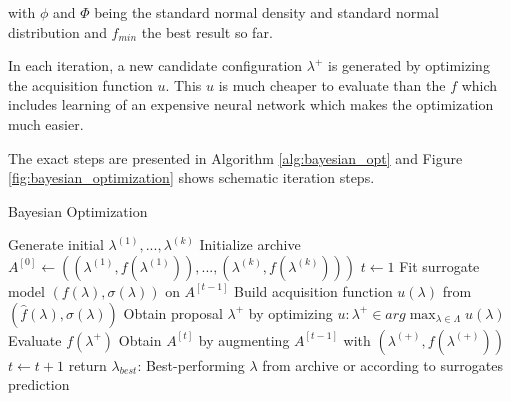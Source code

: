 with $ \phi $ and $ \Phi $ being the standard normal density and standard normal distribution and $ f_{min} $ the best result so far. 


In each iteration, a new candidate configuration $ \lambda^+ $  is generated by optimizing the acquisition function $ u $. This $ u $ is much cheaper to evaluate than the $ f $ which includes learning of an expensive neural network which makes the optimization much easier.

The exact steps are presented in Algorithm \ref{alg:bayesian_opt} and Figure \ref{fig:bayesian_optimization} shows schematic iteration steps.

\begin{algorithm}[htbp!]
	\caption{Bayesian Optimization}\label{alg:bayesian_opt}
	\begin{algorithmic}
		\State Generate initial $\lambda^{(1)}, ..., \lambda^{(k)} $
		\State Initialize archive $A^{[0]} \gets ((\lambda^{(1)}, f(\lambda^{(1)})), ..., (\lambda^{(k)}, f(\lambda^{(k)})))$
		\State $ t \gets 1 $ 
			\State Fit surrogate model $ (f(\lambda), \sigma(\lambda)) $ on $ A^{[t-1]} $
			\State Build acquisition function $ u(\lambda) $ from $ (\hat{f}(\lambda), \sigma(\lambda)) $
			\State Obtain proposal $ \lambda^{+} $ by optimizing $ u: \lambda^+ \in arg\max_{\lambda \in \Lambda} u(\lambda) $
			\State Evaluate $ f(\lambda^+)$
			\State Obtain $A^[t]$ by augmenting $ A^{[t-1]} $ with $ (\lambda^{(+)}, f(\lambda^{(+)})) $
			\State $ t \gets t+1 $
		\EndWhile
		\State return $ \lambda_{best} $: Best-performing $\lambda$ from archive or according to surrogates prediction
	\end{algorithmic}
\end{algorithm}

